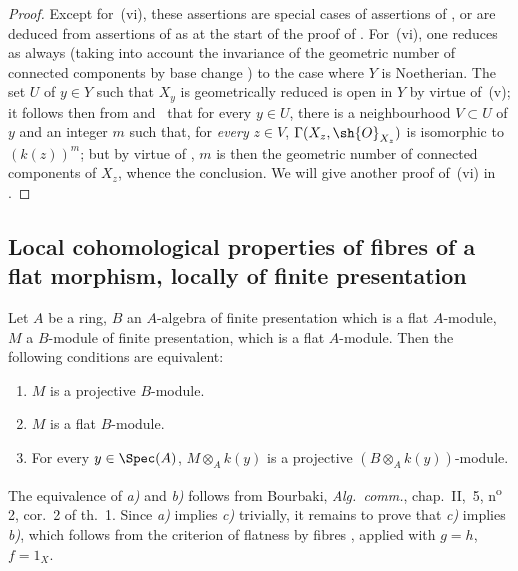 \begin{proof}
Except for~(vi), these assertions are special cases of assertions of , or are deduced from assertions of  as at the start of the proof of .
For~(vi), one reduces as always (taking into account the invariance of the geometric number of connected components by base change ) to the case where $Y$ is Noetherian.
The set $U$ of $y\in Y$ such that $X_y$ is geometrically reduced is open in $Y$ by virtue of~(v); it follows then from  and~ that for every $y\in U$, there is a neighbourhood $V\subset U$ of $y$ and an integer $m$ such that, for \emph{every} $z\in V$, $\Gamma(X_z,\sh{O}_{X_z})$ is isomorphic to $(k(z))^m$; but by virtue of , $m$ is then the geometric number of connected components of $X_z$, whence the conclusion.
We will give another proof of~(vi) in .
\end{proof}


\subsection{Local cohomological properties of fibres of a flat morphism, locally of finite presentation}
\label{subsection:IV.12.3}


\begin{lemma}[12.3.1]
\label{IV.12.3.1}
Let $A$ be a ring, $B$ an $A$-algebra of finite presentation which is a flat $A$-module, $M$ a $B$-module of finite presentation, which is a flat $A$-module.
Then the following conditions are equivalent:
\begin{enumerate}[label=\emph{\alph*)}]
  \item $M$ is a projective $B$-module.
  \item $M$ is a flat $B$-module.
  \item For every $y\in\Spec(A)$, $M\otimes_A k(y)$ is a projective $(B\otimes_A k(y))$-module.
\end{enumerate}
\end{lemma}


The equivalence of \emph{a)} and \emph{b)} follows from Bourbaki, \emph{Alg.\ comm.}, chap.~II, \textsection\,5, n\textsuperscript{o}\,2, cor.~2 of th.~1.
Since \emph{a)} implies \emph{c)} trivially, it remains to prove that \emph{c)} implies \emph{b)}, which follows from the criterion of flatness by fibres , applied with $g=h$, $f=1_X$.

